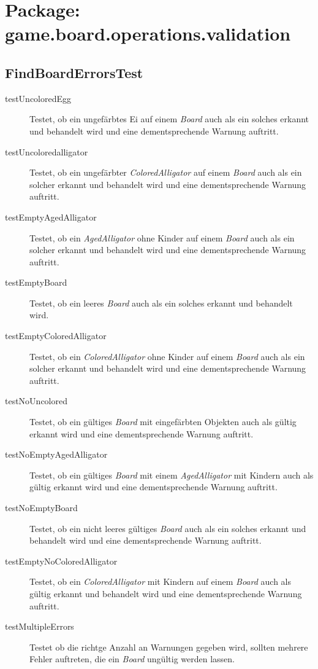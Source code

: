 \section{Package: game.board.operations.validation}
\subsection{FindBoardErrorsTest}
	\begin{description}
		\item[testUncoloredEgg] Testet, ob ein ungefärbtes Ei auf einem \emph{Board} auch als ein solches erkannt und 
			behandelt wird und eine dementsprechende Warnung auftritt.
		\item[testUncoloredalligator] Testet, ob ein ungefärbter \emph{ColoredAlligator} auf einem \emph{Board} auch als 
			ein solcher erkannt und behandelt wird und eine dementsprechende Warnung auftritt.
		\item[testEmptyAgedAlligator] Testet, ob ein \emph{AgedAlligator} ohne Kinder auf einem \emph{Board} auch als 
			ein solcher erkannt und behandelt wird und eine dementsprechende Warnung auftritt.
		\item[testEmptyBoard] Testet, ob ein leeres \emph{Board} auch als ein solches erkannt und behandelt wird.
		\item[testEmptyColoredAlligator] Testet, ob ein \emph{ColoredAlligator} ohne Kinder auf einem \emph{Board} auch 
			als ein solcher erkannt und behandelt wird und eine dementsprechende Warnung auftritt.
		\item[testNoUncolored] Testet, ob ein gültiges \emph{Board} mit eingefärbten Objekten auch als gültig erkannt 
			wird und eine dementsprechende Warnung auftritt.
		\item[testNoEmptyAgedAlligator] Testet, ob ein gültiges \emph{Board} mit einem \emph{AgedAlligator} mit Kindern 
			auch als gültig erkannt wird und eine dementsprechende Warnung auftritt.
		\item[testNoEmptyBoard] Testet, ob ein nicht leeres gültiges \emph{Board} auch als ein solches erkannt und 
			behandelt wird und eine dementsprechende Warnung auftritt.
		\item[testEmptyNoColoredAlligator] Testet, ob ein \emph{ColoredAlligator} mit Kindern auf einem \emph{Board} 
			auch als gültig erkannt und behandelt wird und eine dementsprechende Warnung auftritt.
		\item[testMultipleErrors] Testet ob die richtge Anzahl an Warnungen gegeben wird, sollten mehrere Fehler 
			auftreten, die ein \emph{Board} ungültig werden lassen.
	\end{description}

